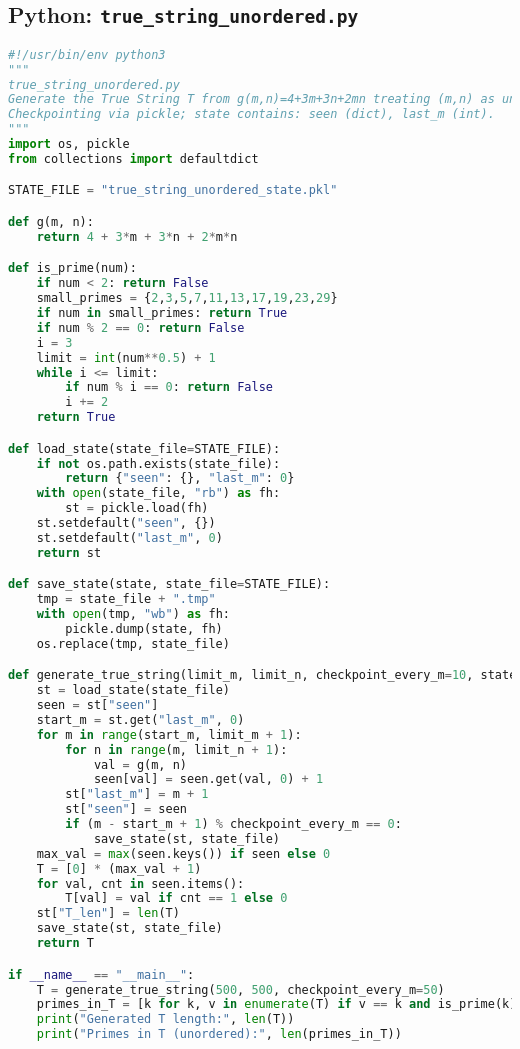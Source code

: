 \documentclass[12pt]{article}
\theoremstyle{definition}
\theoremstyle{plain}
\begin{document}
\subsection{Python: \texttt{true\_string\_unordered.py}}
\begin{lstlisting}[language=Python]
#!/usr/bin/env python3
"""
true_string_unordered.py
Generate the True String T from g(m,n)=4+3m+3n+2mn treating (m,n) as unordered.
Checkpointing via pickle; state contains: seen (dict), last_m (int).
"""
import os, pickle
from collections import defaultdict

STATE_FILE = "true_string_unordered_state.pkl"

def g(m, n):
    return 4 + 3*m + 3*n + 2*m*n

def is_prime(num):
    if num < 2: return False
    small_primes = {2,3,5,7,11,13,17,19,23,29}
    if num in small_primes: return True
    if num % 2 == 0: return False
    i = 3
    limit = int(num**0.5) + 1
    while i <= limit:
        if num % i == 0: return False
        i += 2
    return True

def load_state(state_file=STATE_FILE):
    if not os.path.exists(state_file):
        return {"seen": {}, "last_m": 0}
    with open(state_file, "rb") as fh:
        st = pickle.load(fh)
    st.setdefault("seen", {})
    st.setdefault("last_m", 0)
    return st

def save_state(state, state_file=STATE_FILE):
    tmp = state_file + ".tmp"
    with open(tmp, "wb") as fh:
        pickle.dump(state, fh)
    os.replace(tmp, state_file)

def generate_true_string(limit_m, limit_n, checkpoint_every_m=10, state_file=STATE_FILE):
    st = load_state(state_file)
    seen = st["seen"]
    start_m = st.get("last_m", 0)
    for m in range(start_m, limit_m + 1):
        for n in range(m, limit_n + 1):
            val = g(m, n)
            seen[val] = seen.get(val, 0) + 1
        st["last_m"] = m + 1
        st["seen"] = seen
        if (m - start_m + 1) % checkpoint_every_m == 0:
            save_state(st, state_file)
    max_val = max(seen.keys()) if seen else 0
    T = [0] * (max_val + 1)
    for val, cnt in seen.items():
        T[val] = val if cnt == 1 else 0
    st["T_len"] = len(T)
    save_state(st, state_file)
    return T

if __name__ == "__main__":
    T = generate_true_string(500, 500, checkpoint_every_m=50)
    primes_in_T = [k for k, v in enumerate(T) if v == k and is_prime(k)]
    print("Generated T length:", len(T))
    print("Primes in T (unordered):", len(primes_in_T))
\end{lstlisting}
\end{document}
